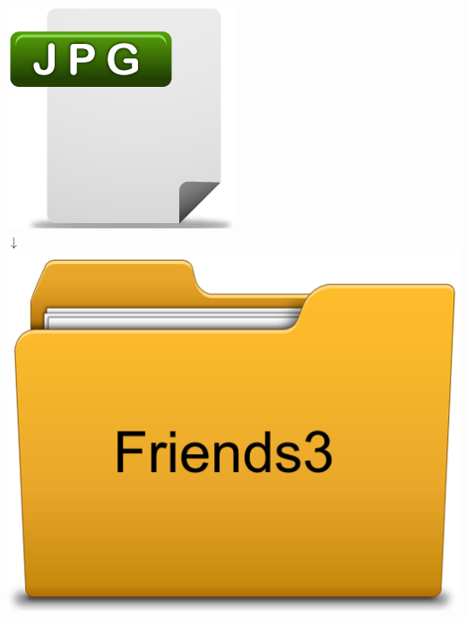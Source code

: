 \documentclass{beamer}
\begin{document}
\begin{frame}
\begin{columns}[t]
     \begin{column}[T]{3cm}
     \begin{center}
     \includegraphics[scale=0.2]{images/file/jpgicon.png} \\
     $\boldsymbol{\downarrow}$ \\
     \includegraphics[scale=0.15]{images/folder/friends3}       
     \end{center} 
     \end{column}

     \end{columns}
  \end{frame}
  
\end{document}
